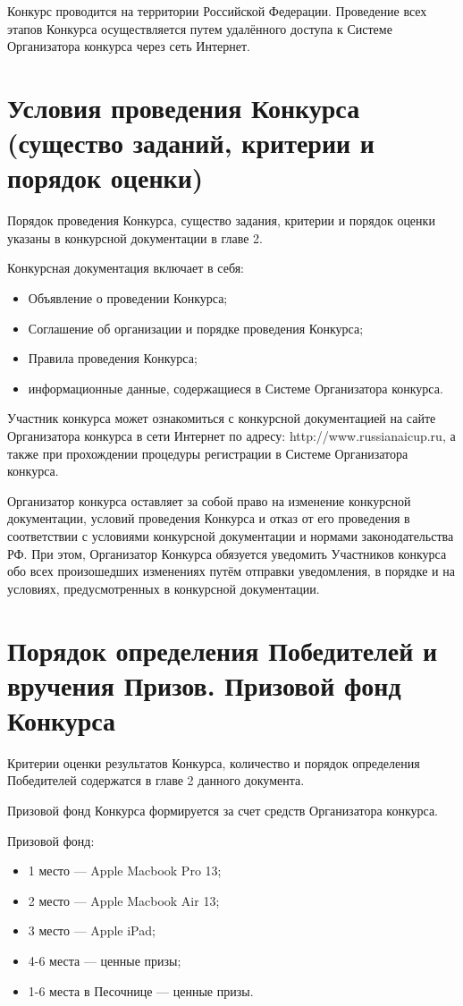 Конкурс проводится на территории Российской Федерации. Проведение всех этапов Конкурса осуществляется путем удалённого доступа к Системе
Организатора конкурса через сеть Интернет.

\section{Условия проведения Конкурса (существо заданий, критерии и порядок оценки)}

Порядок проведения Конкурса, существо задания, критерии и порядок оценки указаны в конкурсной документации в главе 2.

Конкурсная документация включает в себя:
\begin{itemize}
\item Объявление о проведении Конкурса;
\item Соглашение об организации и порядке проведения Конкурса;
\item Правила проведения Конкурса;
\item информационные данные, содержащиеся в Системе Организатора конкурса.
\end{itemize}

Участник конкурса может ознакомиться с конкурсной документацией на сайте Организатора конкурса в сети Интернет по адресу:
http://www.russianaicup.ru, а также при прохождении процедуры регистрации в Системе Организатора конкурса.

Организатор конкурса оставляет за собой право на изменение конкурсной документации, условий проведения Конкурса и отказ от его проведения в
соответствии с условиями конкурсной документации и нормами законодательства РФ. При этом, Организатор Конкурса обязуется уведомить
Участников конкурса обо всех произошедших изменениях путём отправки уведомления, в порядке и на условиях, предусмотренных в конкурсной
документации.

\section{Порядок определения Победителей и вручения Призов. Призовой фонд Конкурса}

Критерии оценки результатов Конкурса, количество и порядок определения Победителей содержатся в главе 2 данного документа.

Призовой фонд Конкурса формируется за счет средств Организатора конкурса.

Призовой фонд:
\begin{itemize}
\item 1 место --- Apple Macbook Pro 13\textquotedbl;
\item 2 место --- Apple Macbook Air 13\textquotedbl;
\item 3 место --- Apple iPad;
\item 4-6 места --- ценные призы;
\item 1-6 места в Песочнице --- ценные призы.
\end{itemize}

